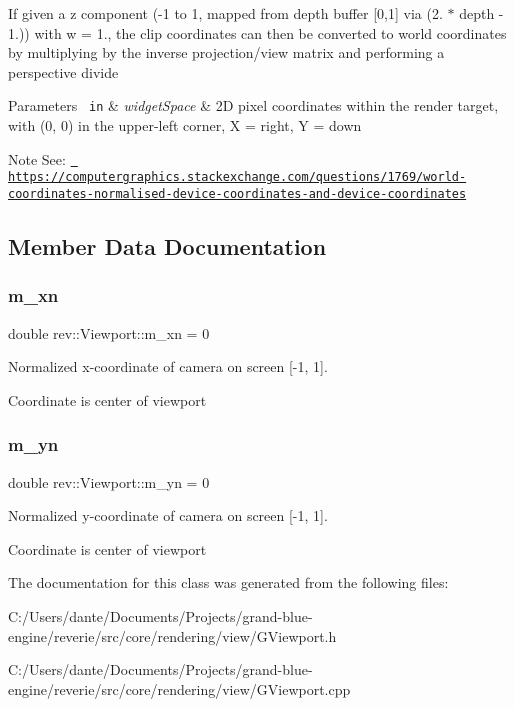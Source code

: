 If given a z component (-\/1 to 1, mapped from depth buffer \mbox{[}0,1\mbox{]} via (2. $\ast$ depth -\/ 1.)) with w = 1., the clip coordinates can then be converted to world coordinates by multiplying by the inverse projection/view matrix and performing a perspective divide 
\begin{DoxyParams}[1]{Parameters}
\mbox{\texttt{ in}}  & {\em widget\+Space} & 2D pixel coordinates within the render target, with (0, 0) in the upper-\/left corner, X = right, Y = down \\
\hline
\end{DoxyParams}
\begin{DoxyNote}{Note}
See\+: \href{https://computergraphics.stackexchange.com/questions/1769/world-coordinates-normalised-device-coordinates-and-device-coordinates}{\texttt{ https\+://computergraphics.\+stackexchange.\+com/questions/1769/world-\/coordinates-\/normalised-\/device-\/coordinates-\/and-\/device-\/coordinates}} 
\end{DoxyNote}


\subsection{Member Data Documentation}
\mbox{\label{classrev_1_1_viewport_aa2800b651ac224ff1c5142b79bedcb18}} 
\subsubsection{\texorpdfstring{m\_xn}{m\_xn}}
{\footnotesize\ttfamily double rev\+::\+Viewport\+::m\+\_\+xn = 0}



Normalized x-\/coordinate of camera on screen \mbox{[}-\/1, 1\mbox{]}. 

Coordinate is center of viewport \mbox{\label{classrev_1_1_viewport_a2f7f203e1175985f91f10b479b03fb22}} 
\subsubsection{\texorpdfstring{m\_yn}{m\_yn}}
{\footnotesize\ttfamily double rev\+::\+Viewport\+::m\+\_\+yn = 0}



Normalized y-\/coordinate of camera on screen \mbox{[}-\/1, 1\mbox{]}. 

Coordinate is center of viewport 

The documentation for this class was generated from the following files\+:\begin{DoxyCompactItemize}
\item 
C\+:/\+Users/dante/\+Documents/\+Projects/grand-\/blue-\/engine/reverie/src/core/rendering/view/G\+Viewport.\+h\item 
C\+:/\+Users/dante/\+Documents/\+Projects/grand-\/blue-\/engine/reverie/src/core/rendering/view/G\+Viewport.\+cpp\end{DoxyCompactItemize}
